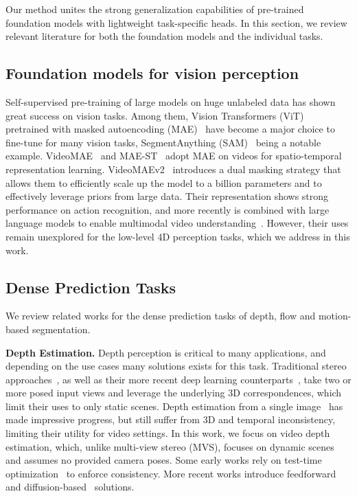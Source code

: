 Our method unites the strong generalization capabilities of pre-trained foundation models with lightweight task-specific heads. 
In this section, we review relevant literature for both the foundation models and the individual tasks. 

\subsection{Foundation models for vision perception}
Self-supervised pre-training of large models on huge unlabeled data has shown great success on vision tasks.
Among them, Vision Transformers (ViT)~\cite{vit} pretrained with masked autoencoding (MAE)~\cite{he2022masked} have become a major choice to fine-tune for many vision tasks, SegmentAnything (SAM)~\cite{kirillov2023SAM} being a notable example.
VideoMAE~\cite{tong2022videomae} and MAE-ST~\cite{feichtenhofer2022maest} adopt MAE on videos for spatio-temporal representation learning.
VideoMAEv2~\cite{wang2023videomaev2} introduces a dual masking strategy that allows them to efficiently scale up the model to a billion parameters and to effectively leverage priors from large data.
Their representation shows strong performance on action recognition, and more recently is combined with large language models to enable multimodal video understanding~\cite{wang2024internvideo2,2023videochat}.
However, their uses remain unexplored for the low-level 4D perception tasks, which we address in this work.

\subsection{Dense Prediction Tasks}
We review related works for the dense prediction tasks of depth, flow and motion-based segmentation.

\noindent
\textbf{Depth Estimation.}
Depth perception is critical to many applications, and depending on the use cases many solutions exists for this task. 
Traditional stereo approaches~\cite{furukawa2009accurate, galliani2015massively,schonberger2016pixelwise}, as well as their more recent deep learning counterparts~\cite{yao2018mvsnet,huang2018deepmvs, sayed2022simplerecon}, take two or more posed input views and leverage the underlying 3D correspondences, which limit their uses to only static scenes.
Depth estimation from a single image~\cite{eigen2014depth,ranftl2020midas,ranftl2021dpt, yang2024depthanything,yang2024depthanythingv2} 
has made impressive progress, but still suffer from 3D and temporal inconsistency, limiting their utility for video settings.
In this work, we focus on video depth estimation, which, unlike multi-view stereo (MVS), focuses on dynamic scenes and assumes no provided camera poses.
Some early works rely on test-time optimization~\cite{luo2020consistent,kopf2021robust} to enforce consistency.
More recent works introduce feedforward~\cite{teed2018deepv2d, wang2023nvds} and diffusion-based~\cite{shao2024chronodepth,hu2024depthcrafter,zhao2024stereocrafter} solutions. 

